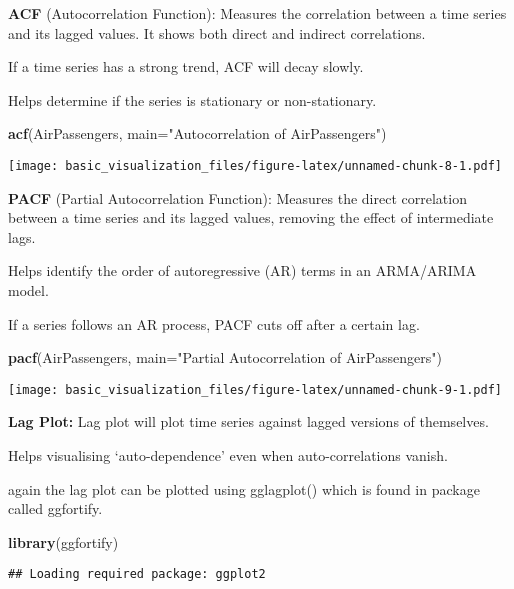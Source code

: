 \documentclass[
]{article}
\newenvironment{Shaded}{\begin{snugshade}}{\end{snugshade}}
\newcommand{\AttributeTok}[1]{\textcolor[rgb]{0.13,0.29,0.53}{#1}}
\newcommand{\FunctionTok}[1]{\textcolor[rgb]{0.13,0.29,0.53}{\textbf{#1}}}
\newcommand{\NormalTok}[1]{#1}
\newcommand{\StringTok}[1]{\textcolor[rgb]{0.31,0.60,0.02}{#1}}
\begin{document}
\textbf{ACF} (Autocorrelation Function): Measures the correlation
between a time series and its lagged values. It shows both direct and
indirect correlations.

If a time series has a strong trend, ACF will decay slowly.

Helps determine if the series is stationary or non-stationary.

\begin{Shaded}
\begin{Highlighting}[]
\FunctionTok{acf}\NormalTok{(AirPassengers, }\AttributeTok{main=}\StringTok{"Autocorrelation of AirPassengers"}\NormalTok{)}
\end{Highlighting}
\end{Shaded}

\texttt{[image: basic\_visualization\_files/figure-latex/unnamed-chunk-8-1.pdf]}

\textbf{PACF} (Partial Autocorrelation Function): Measures the direct
correlation between a time series and its lagged values, removing the
effect of intermediate lags.

Helps identify the order of autoregressive (AR) terms in an ARMA/ARIMA
model.

If a series follows an AR process, PACF cuts off after a certain lag.

\begin{Shaded}
\begin{Highlighting}[]
\FunctionTok{pacf}\NormalTok{(AirPassengers, }\AttributeTok{main=}\StringTok{"Partial Autocorrelation of AirPassengers"}\NormalTok{)}
\end{Highlighting}
\end{Shaded}

\texttt{[image: basic\_visualization\_files/figure-latex/unnamed-chunk-9-1.pdf]}

\textbf{Lag Plot:} Lag plot will plot time series against lagged
versions of themselves.

Helps visualising `auto-dependence' even when auto-correlations vanish.

again the lag plot can be plotted using gglagplot() which is found in
package called ggfortify.

\begin{Shaded}
\begin{Highlighting}[]
\FunctionTok{library}\NormalTok{(ggfortify)}
\end{Highlighting}
\end{Shaded}

\begin{verbatim}
## Loading required package: ggplot2
\end{verbatim}
\end{document}
